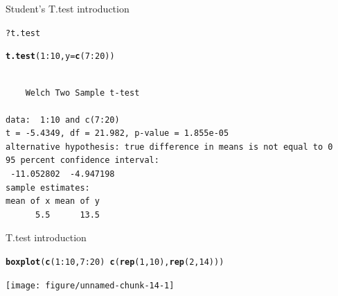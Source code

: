 \documentclass[10pt]{beamer}\usepackage[]{graphicx}\usepackage[]{color}
\makeatletter
\newcommand{\hlnum}[1]{\textcolor[rgb]{0.686,0.059,0.569}{#1}}%
\newcommand{\hlopt}[1]{\textcolor[rgb]{0,0,0}{#1}}%
\newcommand{\hlstd}[1]{\textcolor[rgb]{0.345,0.345,0.345}{#1}}%
\newcommand{\hlkwc}[1]{\textcolor[rgb]{0.333,0.667,0.333}{#1}}%
\newcommand{\hlkwd}[1]{\textcolor[rgb]{0.737,0.353,0.396}{\textbf{#1}}}%
\newenvironment{kframe}{%
 \def\at@end@of@kframe{}%
 \ifinner\ifhmode%
  \def\at@end@of@kframe{\end{minipage}}%
  \begin{minipage}{\columnwidth}%
 \fi\fi%
 \def\FrameCommand##1{\hskip\@totalleftmargin \hskip-\fboxsep
 \colorbox{shadecolor}{##1}\hskip-\fboxsep
     \hskip-\linewidth \hskip-\@totalleftmargin \hskip\columnwidth}%
 \MakeFramed {\advance\hsize-\width
   \@totalleftmargin\z@ \linewidth\hsize
   \@setminipage}}%
 {\par\unskip\endMakeFramed%
 \at@end@of@kframe}
\newenvironment{knitrout}{}{} %
\makeatother
\begin{document}
\begin{frame}[fragile]{Student's T.test introduction}%
\begin{knitrout}
\color{fgcolor}\begin{kframe}
\begin{alltt}
\hlopt{?}\hlstd{t.test}
\end{alltt}
\end{kframe}
\end{knitrout}
  
  \pause
\begin{knitrout}
\color{fgcolor}\begin{kframe}
\begin{alltt}
\hlkwd{t.test}\hlstd{(}\hlnum{1}\hlopt{:}\hlnum{10}\hlstd{,} \hlkwc{y} \hlstd{=} \hlkwd{c}\hlstd{(}\hlnum{7}\hlopt{:}\hlnum{20}\hlstd{))}
\end{alltt}
\begin{verbatim}

	Welch Two Sample t-test

data:  1:10 and c(7:20)
t = -5.4349, df = 21.982, p-value = 1.855e-05
alternative hypothesis: true difference in means is not equal to 0
95 percent confidence interval:
 -11.052802  -4.947198
sample estimates:
mean of x mean of y 
      5.5      13.5 
\end{verbatim}
\end{kframe}
\end{knitrout}
  
\end{frame}

\begin{frame}[fragile]{T.test introduction}%

\begin{knitrout}
\color{fgcolor}\begin{kframe}
\begin{alltt}
  \hlkwd{boxplot}\hlstd{(}\hlkwd{c}\hlstd{(}\hlnum{1}\hlopt{:}\hlnum{10}\hlstd{,} \hlnum{7}\hlopt{:}\hlnum{20}\hlstd{)} \hlopt{~} \hlkwd{c}\hlstd{(}\hlkwd{rep}\hlstd{(}\hlnum{1}\hlstd{,}\hlnum{10}\hlstd{),} \hlkwd{rep}\hlstd{(}\hlnum{2}\hlstd{,} \hlnum{14}\hlstd{)))}
\end{alltt}
\end{kframe}
\texttt{[image: figure/unnamed-chunk-14-1]} 

\end{knitrout}
\end{frame}
\end{document}
